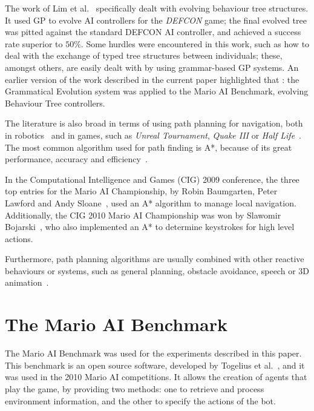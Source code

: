 \documentclass[conference]{IEEEtran}
\begin{document}
The work of Lim et al.~\cite{LBC10} specifically
dealt with evolving behaviour tree structures. It used GP
to evolve AI controllers for the \textit{DEFCON} game; the final evolved
tree was pitted against the standard DEFCON AI controller, and achieved a
success rate superior to $50\%$. Some hurdles
were encountered in this work, such as how to deal with the exchange of typed
tree structures between individuals; these, amongst others, are easily dealt
with by using grammar-based GP systems. An earlier version of the work
described in the current paper highlighted that \cite{PNO11}: the Grammatical
Evolution system was applied to the Mario AI Benchmark, evolving Behaviour
Tree controllers.

The literature is also broad in terms of using path planning for navigation, 
both in robotics~\cite{MF03} and in games, such as \textit{Unreal
Tournament}, \textit{Quake III} or \textit{Half Life}~\cite{Bir99}. The most
common algorithm used for path finding is A*, because of its great performance,
accuracy and efficiency~\cite{BT98}. 

In the Computational Intelligence and Games 
(CIG) 2009 conference, the three top entries for the Mario AI Championship, 
by Robin Baumgarten, Peter Lawford and Andy Sloane~\cite{TKB10}, used 
an A* algorithm to manage local navigation. Additionally, the CIG 2010 Mario 
AI Championship was won by Slawomir Bojarski~\cite{BC10}, who also 
implemented an A* to determine keystrokes for high level actions. 

Furthermore, path planning algorithms are usually combined with other reactive 
behaviours or systems, such as general planning, obstacle avoidance, 
speech or 3D animation~\cite{CBP99}. 


\section{The Mario AI Benchmark} \label{sec:marioBench}

The Mario AI Benchmark was used for the experiments
described in this paper. This benchmark is an open source 
software, developed by Togelius et al.~\cite{TKK09}, and it was used 
in the 2010 Mario AI competitions.
It allows the creation of agents that play the game, by 
providing two methods: one to retrieve and process environment information,
and the other to specify the actions of the bot.
\end{document}
